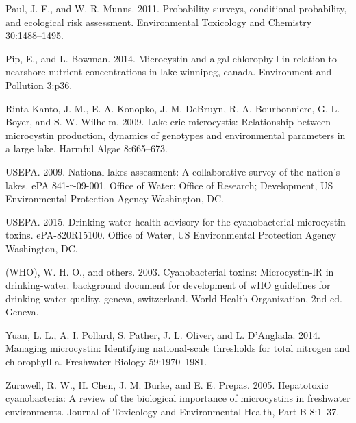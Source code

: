 \documentclass[11pt,]{article}
\begin{document}
Paul, J. F., and W. R. Munns. 2011. Probability surveys, conditional
probability, and ecological risk assessment. Environmental Toxicology
and Chemistry 30:1488--1495.

Pip, E., and L. Bowman. 2014. Microcystin and algal chlorophyll in
relation to nearshore nutrient concentrations in lake winnipeg, canada.
Environment and Pollution 3:p36.

Rinta-Kanto, J. M., E. A. Konopko, J. M. DeBruyn, R. A. Bourbonniere, G.
L. Boyer, and S. W. Wilhelm. 2009. Lake erie microcystis: Relationship
between microcystin production, dynamics of genotypes and environmental
parameters in a large lake. Harmful Algae 8:665--673.

USEPA. 2009. National lakes assessment: A collaborative survey of the
nation's lakes. ePA 841-r-09-001. Office of Water; Office of Research;
Development, US Environmental Protection Agency Washington, DC.

USEPA. 2015. Drinking water health advisory for the cyanobacterial
microcystin toxins. ePA-820R15100. Office of Water, US Environmental
Protection Agency Washington, DC.

(WHO), W. H. O., and others. 2003. Cyanobacterial toxins: Microcystin-lR
in drinking-water. background document for development of wHO guidelines
for drinking-water quality. geneva, switzerland. World Health
Organization, 2nd ed. Geneva.

Yuan, L. L., A. I. Pollard, S. Pather, J. L. Oliver, and L. D'Anglada.
2014. Managing microcystin: Identifying national-scale thresholds for
total nitrogen and chlorophyll a. Freshwater Biology 59:1970--1981.

Zurawell, R. W., H. Chen, J. M. Burke, and E. E. Prepas. 2005.
Hepatotoxic cyanobacteria: A review of the biological importance of
microcystins in freshwater environments. Journal of Toxicology and
Environmental Health, Part B 8:1--37.
\end{document}
